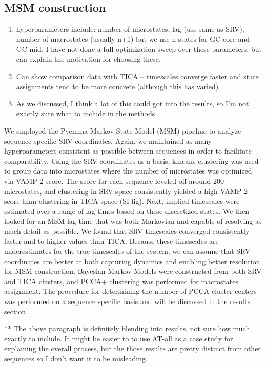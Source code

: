 \documentclass[journal=jpcbfk,manuscript=article]{achemso}
\begin{document}
\subsection{\label{methods}MSM construction}
\begin{enumerate}
	\item hyperparameters include: number of microstates, lag (use same as SRV), number of macrostates (usually n+1) but we use n states for GC-core and GC-mid. I have not done a full optimization sweep over these parameters, but can explain the motivation for choosing these.
    \item Can show comparison data with TICA -- timescales converge faster and state assignments tend to be more concrete (although this has varied) 
    \item As we discussed, I think a lot of this could got into the results, so I'm not exactly sure what to include in the methods
\end{enumerate} 

We employed the Pyemma Markov State Model (MSM) pipeline to analyze sequence-specific SRV coordinates. Again, we maintained as many hyperparameters consistent as possible between sequences in order to facilitate comparability. Using the SRV coordinates as a basis, kmeans clustering was used to group data into microstates where the number of microstates was optimized via VAMP-2 score. The score for each sequence leveled off around 200 microstates, and clustering in SRV space consistently yielded a high VAMP-2 score than clustering in TICA space (SI fig). Next, implied timescales were estimated over a range of lag times based on these discretized states. We then looked for an MSM lag time that was both Markovian and capable of resolving as much detail as possible. We found that SRV timescales converged consistently faster and to higher values than TICA. Because these timescales are underestimates for the true timescales of the system, we can assume that SRV coordinates are better at both capturing dynamics and enabling better resolution for MSM construction. Bayesian Markov Models were constructed from both SRV and TICA clusters, and PCCA+ clustering was performed for macrostates assignment. The procedure for determining the number of PCCA cluster centers was performed on a sequence specific basis and will be discussed in the results section.

** The above paragraph is definitely blending into results, not sure how much exactly to include. It might be easier to to use AT-all as a case study for explaining the overall process, but the those results are pretty distinct from other sequences so I don't want it to be misleading.
\end{document}
